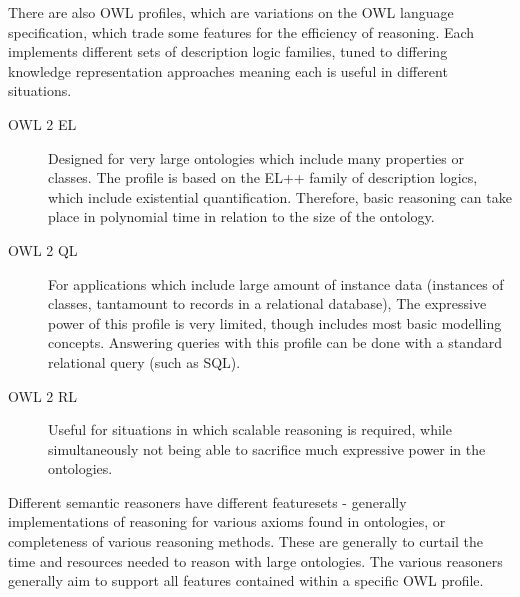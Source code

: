 \documentclass{article}
\begin{document}
There are also OWL profiles\cite{owlprofiles}, which are variations on the OWL
language specification, which trade some features for the efficiency of reasoning.
Each implements different sets of description logic families, tuned to differing
knowledge representation approaches meaning each is useful in different situations.

\begin{description}
    \item[OWL 2 EL] Designed for very large ontologies which include many
    properties or classes. The profile is based on the EL++ family of 
    description logics, which include existential quantification. Therefore,
    basic reasoning can take place in polynomial time in relation to the size of
    the ontology.
    \item[OWL 2 QL] For applications which include large amount of instance data
    (instances of classes, tantamount to records in a relational database), The
    expressive power of this profile is very limited, though includes most basic
    modelling concepts. Answering queries with this profile can be done with a
    standard relational query (such as SQL).
    \item[OWL 2 RL] Useful for situations in which scalable reasoning is
    required, while simultaneously not being able to sacrifice much expressive
    power in the ontologies.
\end{description}

Different semantic reasoners have different featuresets - generally
implementations of reasoning for various axioms found in ontologies, or
completeness of various reasoning methods. These are generally to curtail 
the time and resources needed to reason with large ontologies. The various
reasoners generally aim to support all features contained within a specific OWL
profile\cite{reasonercompare}\cite{reasonerbenchmark}.
\end{document}
